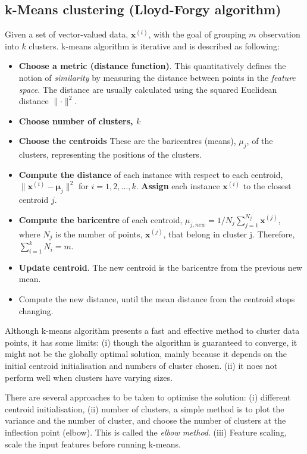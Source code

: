 \documentclass[a4paper,10pt]{article}
\begin{document}
\subsection{k-Means clustering (Lloyd-Forgy algorithm)}
Given a set of vector-valued data, $\mathbf{x}^{(i)}$, with the goal of grouping $m$ observation into $k$ clusters. k-means algorithm is iterative and is described as following:
\begin{itemize}
    \item \textbf{Choose a metric (distance function)}. This quantitatively defines the notion of \textit{similarity} by measuring the distance between points in the \textit{feature space}. The distance are usually calculated using the squared Euclidean distance $\lVert\cdot\rVert^2$.
    \item \textbf{Choose number of clusters, $k$}
    \item \textbf{Choose the centroids} These are the baricentres (means), $\mu_j$, of the clusters, representing the positions of the clusters. 
    \item \textbf{Compute the distance} of each instance with respect to each centroid, $\lVert\pmb{x}^{(i)}-\pmb{\mu}_j\rVert^2$ for $i=1,2,\dots, k$. \textbf{Assign} each instance $\pmb{x}^{(i)}$ to the closest centroid $j$.
    \item \textbf{Compute the baricentre} of each centroid, $\mu_{j,new}=1/N_j\sum_{j=1}^{N_j}\pmb{x}^{(j)}$, where $N_j$ is the number of points, $\pmb{x}^{(j)}$, that belong in cluster j. Therefore, $\sum_{i=1}^{k}N_i=m$. 
    \item \textbf{Update centroid}. The new centroid is the baricentre from the previous new mean. 
    \item Compute the new distance, until the mean distance from the centroid stops changing. 
\end{itemize}

Although k-means algorithm presents a fast and effective method to cluster data points, it has some limits: (i) though the algorithm is guaranteed to converge, it might not be the globally optimal solution, mainly because it depends on the initial centroid initialisation and numbers of cluster chosen. (ii) it noes not perform well when clusters have varying sizes.\par 

There are several approaches to be taken to optimise the solution: (i) different centroid initialisation, (ii) number of clusters, a simple method is to plot the variance and the number of cluster, and choose the number of clusters at the inflection point (elbow). This is called the \textit{elbow method}. (iii) Feature scaling, scale the input features before running k-means. 
\end{document}
